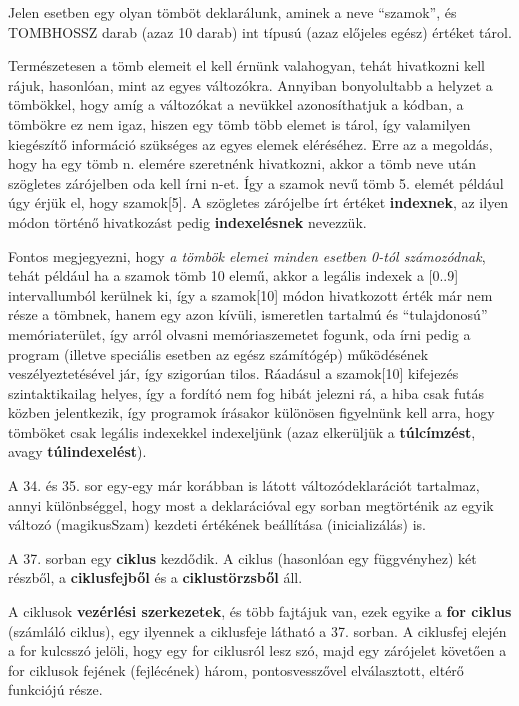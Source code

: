 Jelen esetben egy olyan tömböt deklarálunk, aminek a neve ``szamok'', és TOMB\textunderscore HOSSZ darab (azaz 10 darab) int típusú (azaz előjeles egész) értéket tárol.

Természetesen a tömb elemeit el kell érnünk valahogyan, tehát hivatkozni kell rájuk, hasonlóan, mint az egyes változókra. Annyiban bonyolultabb a helyzet a tömbökkel, hogy amíg a változókat a nevükkel azonosíthatjuk a kódban, a tömbökre ez nem igaz, hiszen egy tömb több elemet is tárol, így valamilyen kiegészítő információ szükséges az egyes elemek eléréséhez. Erre az a megoldás, hogy ha egy tömb n. elemére szeretnénk hivatkozni, akkor a tömb neve után szögletes zárójelben oda kell írni n-et. Így a szamok nevű tömb 5. elemét például úgy érjük el, hogy szamok[5]. A szögletes zárójelbe írt értéket \textbf{indexnek}, az ilyen módon történő hivatkozást pedig \textbf{indexelésnek} nevezzük.

Fontos megjegyezni, hogy \emph{a tömbök elemei minden esetben 0-tól számozódnak}, tehát például ha a szamok tömb 10 elemű, akkor a legális indexek a [0..9] intervallumból kerülnek ki, így a szamok[10] módon hivatkozott érték már nem része a tömbnek, hanem egy azon kívüli, ismeretlen tartalmú és ``tulajdonosú'' memóriaterület, így arról olvasni memóriaszemetet fogunk, oda írni pedig a program (illetve speciális esetben az egész számítógép) működésének veszélyeztetésével jár, így szigorúan tilos. Ráadásul a szamok[10] kifejezés szintaktikailag helyes, így a fordító nem fog hibát jelezni rá, a hiba csak futás közben jelentkezik, így programok írásakor különösen figyelnünk kell arra, hogy tömböket csak legális indexekkel indexeljünk (azaz elkerüljük a \textbf{túlcímzést}, avagy \textbf{túlindexelést}).

A 34. és 35. sor egy-egy már korábban is látott változódeklarációt tartalmaz, annyi különbséggel, hogy most a deklarációval egy sorban megtörténik az egyik változó (magikusSzam) kezdeti értékének beállítása (inicializálás) is.

A 37. sorban egy \textbf{ciklus} kezdődik. A ciklus (hasonlóan egy függvényhez) két részből, a \textbf{ciklusfejből} és a \textbf{ciklustörzsből} áll.

A ciklusok \textbf{vezérlési szerkezetek}, és több fajtájuk van, ezek egyike a \textbf{for ciklus} (számláló ciklus), egy ilyennek a ciklusfeje látható a 37. sorban. A ciklusfej elején a for kulcsszó jelöli, hogy egy for ciklusról lesz szó, majd egy zárójelet követően a for ciklusok fejének (fejlécének) három, pontosvesszővel elválasztott, eltérő funkciójú része.

